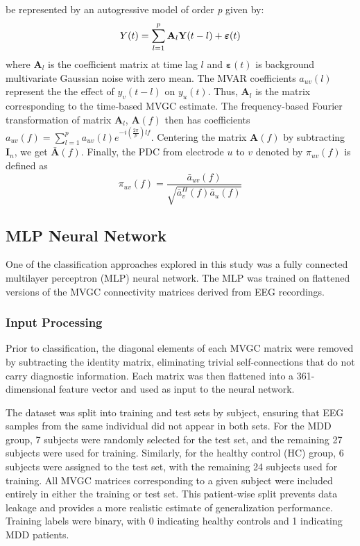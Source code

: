 \documentclass[twocolumn]{NobArticle}
\begin{document}
be represented by an autogressive model of order \textit{p} given by: 
\begin{equation}
    Y(t) = \sum_{l=1}^{p}{\textbf{A}_l\textbf{Y}(t-l)}\space + \boldsymbol{\varepsilon}(t)
\end{equation}
where $\textbf{A}_l$ is the coefficient matrix at time lag $l$ and $\boldsymbol{\varepsilon}(t)$ is background multivariate Gaussian noise with zero mean. The MVAR coefficients $a_{uv}(l)$ represent the the effect of $y_v(t-l)$ on $y_u(t)$. Thus, $\textbf{A}_l$ is the matrix corresponding to the time-based MVGC estimate. The frequency-based Fourier transformation of matrix $\textbf{A}_l$, $\textbf{A}(f)$ then has coefficients $a_{uv}(f) = \sum_{l=1}^{p}{a_{uv}(l)e^{-i(\tfrac{2\pi}{p})lf}}$. Centering the matrix $\textbf{A}(f)$ by subtracting $\textbf{I}_n$, we get $\bar{\textbf{A}}(f)$. Finally, the PDC from electrode $u$ to $v$ denoted by $\pi_{uv}(f)$ is defined as
\begin{equation}
    \pi_{uv}(f) = \dfrac{\bar{a}_{uv}(f)}{\sqrt{\bar{a}_v^H(f)\bar{a}_u(f)}}
\end{equation}

\subsection{MLP Neural Network}

One of the classification approaches explored in this study was a fully connected multilayer perceptron (MLP) neural network. The MLP was trained on flattened versions of the MVGC connectivity matrices derived from EEG recordings. 

\subsubsection{Input Processing}

Prior to classification, the diagonal elements of each MVGC matrix were removed by subtracting the identity matrix, eliminating trivial self-connections that do not carry diagnostic information. Each matrix was then flattened into a 361-dimensional feature vector and used as input to the neural network.

The dataset was split into training and test sets by subject, ensuring that EEG samples from the same individual did not appear in both sets. For the MDD group, 7 subjects were randomly selected for the test set, and the remaining 27 subjects were used for training. Similarly, for the healthy control (HC) group, 6 subjects were assigned to the test set, with the remaining 24 subjects used for training. All MVGC matrices corresponding to a given subject were included entirely in either the training or test set. This patient-wise split prevents data leakage and provides a more realistic estimate of generalization performance. Training labels were binary, with 0 indicating healthy controls and 1 indicating MDD patients.
\end{document}
